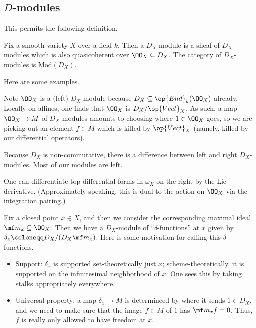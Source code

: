 \documentclass{article}
\begin{document}
\subsection{\texorpdfstring{$D$}{ D}-modules}
This permits the following definition.
\begin{defihelper}[$D$-module] 
	Fix a smooth variety $X$ over a field $k$. Then a $D_X$-module is a sheaf of $D_X$-modules which is also quasicoherent over $\OO_X\subseteq D_X$. The category of $D_X$-modules is $\mathrm{Mod}(D_X)$.
\end{defihelper}
Here are some examples.
\begin{example}
	Note $\OO_X$ is a (left) $D_X$-module because $D_X\subseteq\op{End}_k(\OO_X)$ already. Locally on affines, one finds that $\OO_X$ is $D_X/\op{Vect}_X$. As such, a map $\OO_X\to M$ of $D_X$-modules amounts to choosing where $1\in\OO_X$ goes, so we are picking out an element $f\in M$ which is killed by $\op{Vect}_X$ (namely, killed by our differential operators).
\end{example}
\begin{warn}
	Because $D_X$ is non-commutative, there is a difference between left and right $D_X$-modules. Most of our modules are left.
\end{warn}
\begin{example}
	One can differentiate top differential forms in $\omega_X$ on the right by the Lie derivative. (Approximately speaking, this is dual to the action on $\OO_X$ via the integration pairing.)
\end{example}
\begin{example}
	Fix a closed point $x\in X$, and then we consider the corresponding maximal ideal $\mf m_x\subseteq\OO_X$. Then we have a $D_X$-module of ``$\delta$-functions'' at $x$ given by $\delta_x\coloneqq D_X/(D_X\mf m_x)$. Here is some motivation for calling this $\delta$-functions.
	\begin{itemize}
		\item Support: $\delta_x$ is supported set-theoretically just $x$; scheme-theoretically, it is supported on the infinitesimal neighborhood of $x$. One sees this by taking stalks appropriately everywhere.
		\item Universal property: a map $\delta_x\to M$ is determineed by where it sends $1\in D_X$, and we need to make sure that the image $f\in M$ of $1$ has $\mf m_xf=0$. Thus, $f$ is really only allowed to have freedom at $x$.
	\end{itemize}
\end{example}
\end{document}
